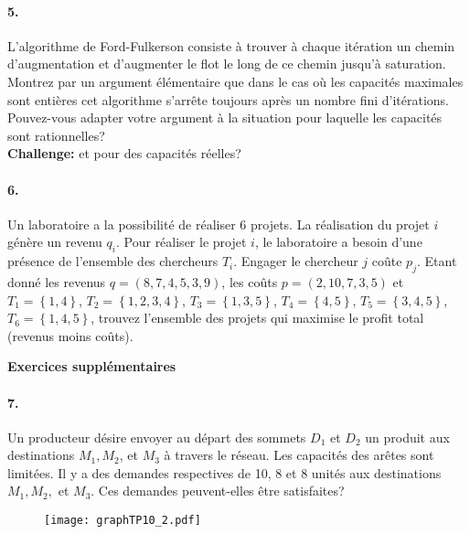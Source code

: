 \paragraph{5. } L'algorithme de Ford-Fulkerson consiste à trouver à chaque itération un chemin d'augmentation et d'augmenter le flot le long de ce chemin jusqu'à saturation. Montrez par un argument élémentaire que dans le cas où les capacités maximales sont entières cet algorithme s'arrête toujours après un nombre fini d'itérations. Pouvez-vous adapter votre argument à la situation pour laquelle les capacités sont rationnelles? \\
\textbf{Challenge:} et pour des capacités réelles? 

\paragraph{6. } Un laboratoire a la possibilité de réaliser 6 projets. La réalisation du projet $i$ génère un revenu $q_i$. Pour réaliser le projet $i$, le laboratoire a besoin d'une présence de l'ensemble des chercheurs $T_i$. Engager le chercheur $j$ coûte $p_j$. Etant donné les revenus $q= (8,7,4,5,3,9)$, les coûts $p=(2,10,7,3,5)$ et $T_1 = \left\lbrace 1, 4 \right\rbrace$, $T_2 = \left\lbrace 1,2,3,4 \right\rbrace$, $T_3 = \left\lbrace 1,3,5 \right\rbrace$, $T_4 = \left\lbrace 4,5 \right\rbrace$, $T_5 = \left\lbrace 3,4,5 \right\rbrace$, $T_6 = \left\lbrace 1, 4,5 \right\rbrace$, trouvez l'ensemble des projets qui maximise le profit total (revenus moins coûts).

\newpage
\textbf{Exercices supplémentaires}

\paragraph{7. } Un producteur désire envoyer au départ des sommets $D_1$ et $D_2$ un produit aux destinations $M_1, M_2$, et $M_3$ à travers le réseau. Les capacités des arêtes sont limitées. Il y a des demandes respectives de 10, 8 et 8 unités aux destinations $M_1, M_2,$ et $M_3$. Ces demandes peuvent-elles être satisfaites? 

\begin{figure}[h!]
\centering
\texttt{[image: graphTP10\_2.pdf]}
\end{figure}

